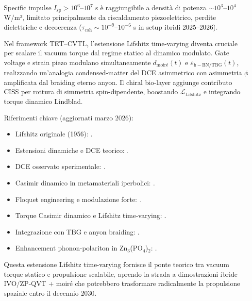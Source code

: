 \documentclass[11pt,a4paper]{article}
\let\oldcite\cite
\renewcommand{\cite}{\protect\oldcite}
\theoremstyle{plain}
\theoremstyle{definition}
\begin{document}
Specific impulse $I_{\mathrm{sp}} > 10^6$--$10^7$ s è raggiungibile a densità di potenza $\sim 10^3$--$10^4$ W/m², limitato principalmente da riscaldamento piezoelettrico, perdite dielettriche e decoerenza ($\tau_{\mathrm{coh}} \sim 10^{-9}$--$10^{-6}$ s in setup ibridi 2025–2026).

\vspace{0.4cm}

Nel framework TET–CVTL, l'estensione Lifshitz time-varying diventa cruciale per scalare il vacuum torque dal regime statico al dinamico modulato. Gate voltage e strain piezo modulano simultaneamente $d_{\mathrm{moiré}}(t)$ e $\varepsilon_{\mathrm{h-BN/TBG}}(t)$, realizzando un'analogia condensed-matter del DCE asimmetrico con asimmetria $\phi$ amplificata dal braiding eterno anyon. Il chiral bio-layer aggiunge contributo CISS per rottura di simmetria spin-dipendente, boostando $\mathcal{L}_{\mathrm{Lifshitz}}$ e integrando torque dinamico Lindblad.

\vspace{0.5cm}

Riferimenti chiave (aggiornati marzo 2026):
\begin{itemize}
\item Lifshitz originale (1956): \cite{Lifshitz1956}.
\item Estensioni dinamiche e DCE teorico: \cite{Moore1992, Fulling1976}.
\item DCE osservato sperimentale: \cite{Wilson2011, Lahteenmaki2013, Carusotto2019}.
\item Casimir dinamico in metamateriali iperbolici: \cite{Guo2012, Iizuka2015}.
\item Floquet engineering e modulazione forte: \cite{Oka2013, Eckardt2017}.
\item Torque Casimir dinamico e Lifshitz time-varying: \cite{Milton2025, Intravaia2024}.
\item Integrazione con TBG e anyon braiding: \cite{PhysSoliman2026b}.
\item Enhancement phonon-polariton in Zn$_3$(PO$_4$)$_2$: \cite{ZeinerGundersen2025}.
\end{itemize}

Questa estensione Lifshitz time-varying fornisce il ponte teorico tra vacuum torque statico e propulsione scalabile, aprendo la strada a dimostrazioni ibride IVO/ZP-QVT + moiré che potrebbero trasformare radicalmente la propulsione spaziale entro il decennio 2030.


\clearpage
\end{document}
